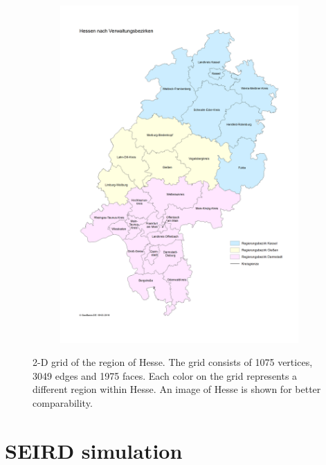 \begin{figure}
\begin{center}
\begin{subfigure}[b]{0.4\textwidth}
			\includegraphics[width=\textwidth]{./figures/Hessen.png}
		\end{subfigure}
	\end{center}
	\caption[2-D grid of Hesse]{2-D grid of the region of Hesse. The grid consists of 1075 vertices, 3049 edges and 1975 faces.
		Each color on the grid represents a different region within Hesse. An image of Hesse is shown
		for better comparability\cite{HesseImage}.}
	\label{fig:2-D_grid}
\end{figure}



\section{SEIRD simulation}

